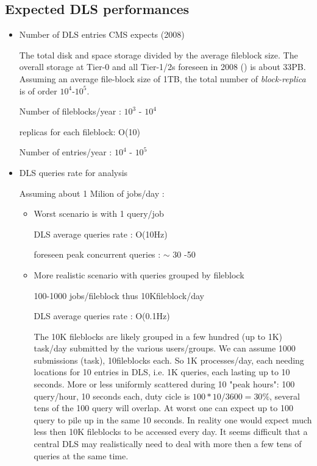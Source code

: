 \documentclass[pdftex]{cmspaper}
\begin{document}
\subsection{Expected DLS performances}
\label{sec:expected}
\begin{itemize}
\item Number of DLS entries CMS expects (2008)

The total disk and space storage divided by the average fileblock size.
The overall storage at Tier-0 and all Tier-1/2s foreseen in 2008 (\cite{CTDR})
is about 33PB. Assuming an average file-block size of 1TB, the
total number of {\em block-replica} is of order $10^{4}$-$10^{5}$.


Number of fileblocks/year  : $10^{3}$ - $10^{4}$

replicas for each fileblock: O(10)

Number of entries/year : $10^{4}$ - $10^{5}$

\item DLS queries rate for analysis

Assuming about 1 Milion of jobs/day :
 \begin{itemize}
 \item Worst scenario is with 1 query/job 

  DLS average queries rate          :  O(10Hz)

  foreseen peak concurrent queries : $\sim$ 30 -50  

 \item More realistic scenario with queries grouped by fileblock

  100-1000 jobs/fileblock thus 10Kfileblock/day

  DLS average queries rate :  O(0.1Hz)


The 10K fileblocks are likely grouped in a few hundred (up to 1K) task/day submitted by the various users/groups.
We can assume 1000 submissions (task), 10fileblocks each. So 1K processes/day,
each needing locations for 10 entries in DLS, i.e. 1K queries, each
lasting up to 10 seconds. More or less uniformly scattered during
10 "peak hours": 100 query/hour, 10 seconds each, duty cicle is $100*10/3600=30\%$, several tens of the 100 query will overlap.
At worst one can expect up to 100 query to pile up in the same 10 seconds.
In reality one would expect much less then 10K fileblocks to be accessed every day.
It seems difficult that a central DLS may realistically need to deal with 
more then a few tens of queries at the same time.
                                                                                

\end{itemize}
\end{itemize}
\end{document}
